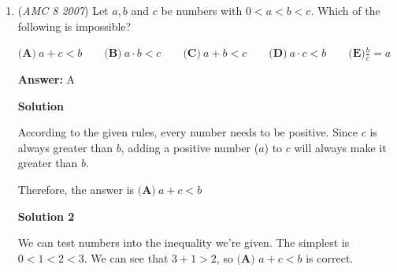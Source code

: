 \begin{enumerate}
 \textbf{Answer: }C



\textbf{Solution 1}

The area of a triangle is shown by $\frac{1}{2}bh$. We set the base equal to $24$, and the area equal to $60$, and we get the triangle's height, or altitude, to be $5$. In this isosceles triangle, the height bisects the base, so by using the Pythagorean Theorem, $a^2+b^2=c^2$, we can solve for one of the legs of the triangle (it will be the hypotenuse, $c$).$a = 12$, $b = 5$,$c = 13$.The answer is $\boxed{\textbf{(C)}\ 13}$.

 



\textbf{Solution 2 (Heron's Formula)}

According to \href{https://artofproblemsolving.com/wiki/index.php?title=Heron\%27s\_Formula}{Heron's Formula}, setting side $a$ as $24$, we have 
 \[\sqrt{s(s-24)(s-b)(s-c)}=60\]where $s$ is the triangle's semiperimeter (i.e. $\frac{a+b+c}{2}$). Since the triangle is isosceles, $b=c$, so we can rewrite $s$ as $\frac{24+2b}{2}=12+b$. Substituting and solving the equation and taking the positive solution for $b$, 
 \[\sqrt{(12+b)(-12+b)(12)(12)}=60\] 
 \[\sqrt{144(144-b^2)}=60\] 
 \[144(144-b^2)=3600\] 
 \[-b^2=-169\] 
 \[b=\boxed{\textbf{(C)}\ 13}\]



	\item (\textit{AMC 8 2007}) Let $a, b$ and $c$ be numbers with $0 < a < b < c$. Which of the following is
impossible?


 $\textbf{(A)} \ a + c < b  \qquad \textbf{(B)} \ a \cdot b < c \qquad \textbf{(C)} \ a + b < c \qquad \textbf{(D)} \ a \cdot c < b \qquad \textbf{(E)}\frac{b}{c} = a$

 \textbf{Answer: }A



\textbf{Solution}

According to the given rules, every number needs to be positive. Since $c$ is always greater than $b$, adding a positive number ($a$) to $c$ will always make it greater than $b$.

 Therefore, the answer is $\boxed{\textbf{(A)}\ a+c<b}$




\textbf{Solution 2}

We can test numbers into the inequality we’re given. The simplest is $0<1<2<3$. We can see that $3+1>2$, so $\boxed{\textbf{(A) }a+c<b}$ is correct.


\end{enumerate}

